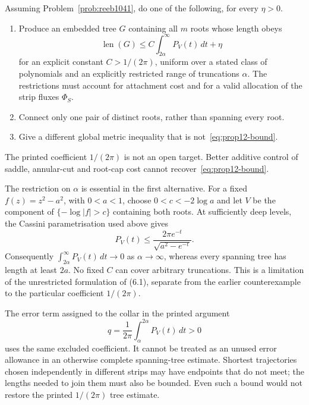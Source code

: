 \documentclass[11pt]{article}
\begin{document}
\begin{problem}\label{prob:metric1041}
Assuming Problem~\ref{prob:reeb1041}, do one of the following, for every
$\eta>0$.
\begin{enumerate}
\item Produce an embedded tree $G$ containing all $m$ roots whose length obeys
  \begin{equation*}
 \operatorname{len}(G)
 \le C\int_{2\alpha}^{\infty}P_V(t)\,dt+\eta
\tag{6.1}\label{eq:metric-fanin1041}
 \end{equation*}
for an explicit constant $C>1/(2\pi)$, uniform over a stated class of
polynomials and an explicitly restricted range of truncations $\alpha$.
The restrictions must account for attachment cost and for a valid allocation
of the strip fluxes $\Phi_S$.
\item Connect only one pair of distinct roots, rather than spanning every root.
\item Give a different global metric inequality that is not~\eqref{eq:prop12-bound}.
\end{enumerate}
The printed coefficient $1/(2\pi)$ is not an open target.  Better additive
control of saddle, annular-cut and root-cap cost cannot recover~\eqref{eq:prop12-bound}.
\end{problem}

The restriction on $\alpha$ is essential in the first alternative.
For a fixed $f(z)=z^2-a^2$, with $0<a<1$, choose
$0<c<-2\log a$ and let $V$ be the component of $\{-\log|f|>c\}$
containing both roots. At sufficiently deep levels, the Cassini
parametrisation used above gives
\[
 P_V(t)\le\frac{2\pi e^{-t}}{\sqrt{a^2-e^{-t}}}.
\]
Consequently $\int_{2\alpha}^\infty P_V(t)\,dt\to0$ as
$\alpha\to\infty$, whereas every spanning tree has length at least
$2a$. No fixed $C$ can cover arbitrary truncations. This is a
limitation of the unrestricted formulation of (6.1), separate from the
earlier counterexample to the particular coefficient $1/(2\pi)$.

The error term assigned to the collar in the printed argument
\[
 q=\frac1{2\pi}\int_{\alpha}^{2\alpha}P_V(t)\,dt>0
\]
uses the same excluded coefficient. It cannot be treated as an unused
error allowance in an otherwise complete spanning-tree estimate.
Shortest trajectories chosen independently in different strips may
have endpoints that do not meet; the lengths needed to join them must
also be bounded. Even such a bound would not restore the printed
$1/(2\pi)$ tree estimate.
\end{document}
